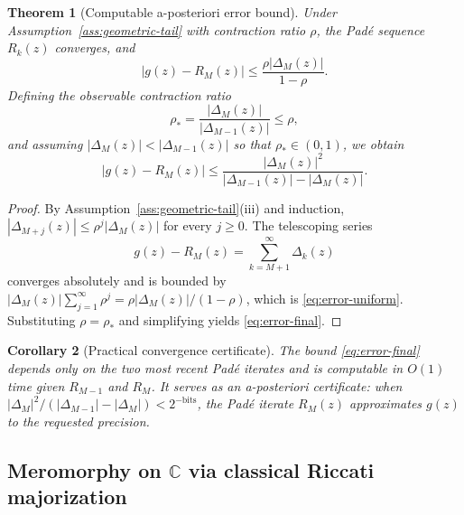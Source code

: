 \documentclass[11pt]{article}
\newtheorem{theorem}{Theorem}[section]
\newtheorem{corollary}[theorem]{Corollary}
\theoremstyle{definition}
\theoremstyle{remark}
\begin{document}
\begin{theorem}[Computable a-posteriori error bound]
\label{thm:error-bound}
Under Assumption~\ref{ass:geometric-tail} with contraction ratio $\rho$, the Pad\'e sequence $R_{k}(z)$ converges, and
\begin{equation}
|g(z)-R_{M}(z)|\le \frac{\rho|\Delta_{M}(z)|}{1-\rho}.
\label{eq:error-uniform}
\end{equation}
Defining the observable contraction ratio
\begin{equation}
\rho_{\ast}=\frac{|\Delta_{M}(z)|}{|\Delta_{M-1}(z)|}\le\rho,
\label{eq:rho-star}
\end{equation}
and assuming $|\Delta_{M}(z)|<|\Delta_{M-1}(z)|$ so that $\rho_{\ast}\in(0,1)$, we obtain
\begin{equation}
\boxed{\;|g(z)-R_{M}(z)|\le \frac{|\Delta_{M}(z)|^{2}}{|\Delta_{M-1}(z)|-|\Delta_{M}(z)|}.\;}
\label{eq:error-final}
\end{equation}
\end{theorem}

\begin{proof}
By Assumption~\ref{ass:geometric-tail}(iii) and induction, $|\Delta_{M+j}(z)|\le\rho^{j}|\Delta_{M}(z)|$ for every $j\ge 0$. The telescoping series
\begin{equation}
g(z)-R_{M}(z)=\sum_{k=M+1}^{\infty}\Delta_{k}(z)
\label{eq:telescoping}
\end{equation}
converges absolutely and is bounded by $|\Delta_{M}(z)|\sum_{j=1}^{\infty}\rho^{j}=\rho|\Delta_{M}(z)|/(1-\rho)$, which is \eqref{eq:error-uniform}. Substituting $\rho=\rho_{\ast}$ and simplifying yields \eqref{eq:error-final}.
\end{proof}

\begin{corollary}[Practical convergence certificate]
\label{cor:practical-cert}
The bound \eqref{eq:error-final} depends only on the two most recent Pad\'e iterates and is computable in $O(1)$ time given $R_{M-1}$ and $R_{M}$. It serves as an a-posteriori certificate: when $|\Delta_{M}|^{2}/(|\Delta_{M-1}|-|\Delta_{M}|)<2^{-\mathrm{bits}}$, the Pad\'e iterate $R_{M}(z)$ approximates $g(z)$ to the requested precision.
\end{corollary}

\subsection{Meromorphy on $\mathbb{C}$ via classical Riccati majorization}
\label{sec:heston-meromorphy}
\end{document}
